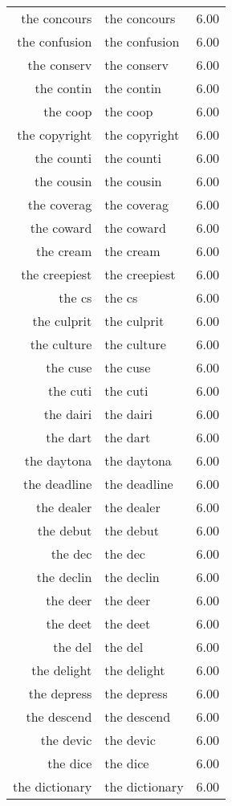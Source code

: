 \begin{table}[ht]
\begin{tabular}{rlr}
  the concours & the concours & 6.00 \\ 
  the confusion & the confusion & 6.00 \\ 
  the conserv & the conserv & 6.00 \\ 
  the contin & the contin & 6.00 \\ 
  the coop & the coop & 6.00 \\ 
  the copyright & the copyright & 6.00 \\ 
  the counti & the counti & 6.00 \\ 
  the cousin & the cousin & 6.00 \\ 
  the coverag & the coverag & 6.00 \\ 
  the coward & the coward & 6.00 \\ 
  the cream & the cream & 6.00 \\ 
  the creepiest & the creepiest & 6.00 \\ 
  the cs & the cs & 6.00 \\ 
  the culprit & the culprit & 6.00 \\ 
  the culture & the culture & 6.00 \\ 
  the cuse & the cuse & 6.00 \\ 
  the cuti & the cuti & 6.00 \\ 
  the dairi & the dairi & 6.00 \\ 
  the dart & the dart & 6.00 \\ 
  the daytona & the daytona & 6.00 \\ 
  the deadline & the deadline & 6.00 \\ 
  the dealer & the dealer & 6.00 \\ 
  the debut & the debut & 6.00 \\ 
  the dec & the dec & 6.00 \\ 
  the declin & the declin & 6.00 \\ 
  the deer & the deer & 6.00 \\ 
  the deet & the deet & 6.00 \\ 
  the del & the del & 6.00 \\ 
  the delight & the delight & 6.00 \\ 
  the depress & the depress & 6.00 \\ 
  the descend & the descend & 6.00 \\ 
  the devic & the devic & 6.00 \\ 
  the dice & the dice & 6.00 \\ 
  the dictionary & the dictionary & 6.00 \\ 

\end{tabular}
\end{table}
